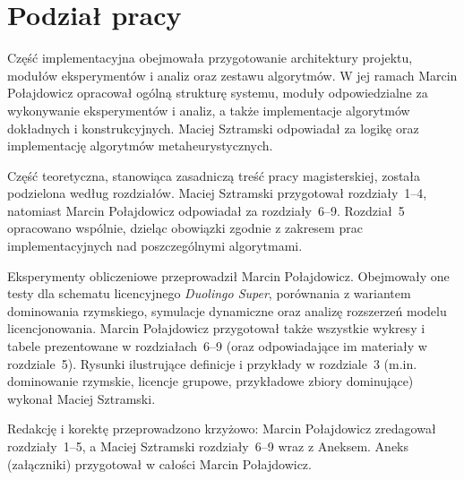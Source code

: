 \chapter*{Podział pracy}

Część implementacyjna obejmowała przygotowanie architektury projektu, modułów eksperymentów i analiz oraz zestawu algorytmów. W jej ramach Marcin Połajdowicz opracował ogólną strukturę systemu, moduły odpowiedzialne za wykonywanie eksperymentów i analiz, a także implementacje algorytmów dokładnych i konstrukcyjnych. Maciej Sztramski odpowiadał za logikę oraz implementację algorytmów metaheurystycznych.

Część teoretyczna, stanowiąca zasadniczą treść pracy magisterskiej, została podzielona według rozdziałów. Maciej Sztramski przygotował rozdziały~1--4, natomiast Marcin Połajdowicz odpowiadał za rozdziały~6--9. Rozdział~5 opracowano wspólnie, dzieląc obowiązki zgodnie z zakresem prac implementacyjnych nad poszczególnymi algorytmami.

Eksperymenty obliczeniowe przeprowadził Marcin Połajdowicz. Obejmowały one testy dla schematu licencyjnego \emph{Duolingo Super}, porównania z wariantem dominowania rzymskiego, symulacje dynamiczne oraz analizę rozszerzeń modelu licencjonowania. Marcin Połajdowicz przygotował także wszystkie wykresy i tabele prezentowane w rozdziałach~6--9 (oraz odpowiadające im materiały w rozdziale~5). Rysunki ilustrujące definicje i przykłady w rozdziale~3 (m.in. dominowanie rzymskie, licencje grupowe, przykładowe zbiory dominujące) wykonał Maciej Sztramski.

Redakcję i korektę przeprowadzono krzyżowo: Marcin Połajdowicz zredagował rozdziały~1--5, a Maciej Sztramski rozdziały~6--9 wraz z Aneksem. Aneks (załączniki) przygotował w całości Marcin Połajdowicz.
